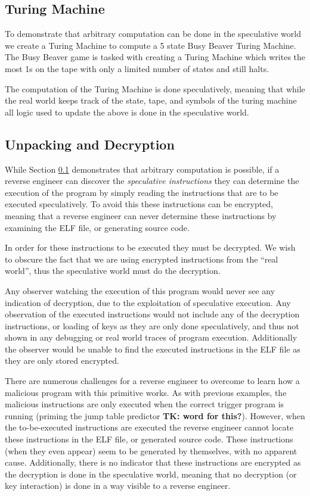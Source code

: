\subsection{Turing Machine}
\label{subsec:turing}
To demonstrate that arbitrary computation can be done in the speculative world
we create a Turing Machine to compute a 5 state Busy Beaver Turing Machine. The
Busy Beaver game is tasked with creating a Turing Machine which writes the most
1s on the tape with only a limited number of states and still halts.

The computation of the Turing Machine is done speculatively, meaning that while
the real world keeps track of the state, tape, and symbols of the turing machine
all logic used to update the above is done in the speculative world.

\subsection{Unpacking and Decryption}
\label{subsec:decryption}
While Section \ref{subsec:turing} demonstrates that arbitrary computation is
possible, if a reverse engineer can discover the \emph{speculative instructions}
they can determine the execution of the program by simply reading the
instructions that are to be executed speculatively. To avoid this these
instructions can be encrypted, meaning that a reverse engineer can never
determine these instructions by examining the ELF file, or generating source
code. 

In order for these instructions to be executed they must be decrypted. We wish
to obscure the fact that we are using encrypted instructions from the ``real
world'', thus  the speculative world must do the decryption. 

Any observer watching the execution of this program would never see any
indication of decryption, due to the exploitation of speculative execution. Any
observation of the executed instructions would not include any of the decryption
instructions, or loading of keys as they are only done speculatively, and thus
not shown in any debugging or real world traces of program execution.
Additionally the observer would be unable to find the executed instructions in
the ELF file as they are only stored encrypted. 

There are numerous challenges for a reverse engineer to overcome to learn how a
malicious program with this primitive works. As with previous examples, the
malicious instructions are only executed when the correct trigger program is
running (priming the jump table predictor \textbf{TK: word for this?}). However,
when the to-be-executed instructions are executed the reverse engineer cannot
locate these instructions in the ELF file, or generated source code. These
instructions (when they even appear) seem to be generated by themselves, with no
apparent cause. Additionally, there is no indicator that these instructions are
encrypted as the decryption is done in the speculative world, meaning that no
decryption (or key interaction) is done in a way visible to a reverse engineer.

